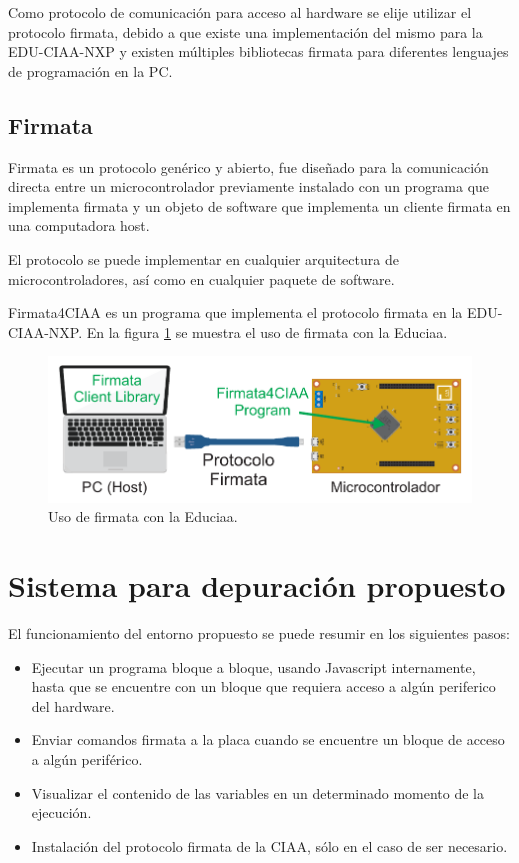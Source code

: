 Como protocolo de comunicación para acceso al hardware se elije utilizar el protocolo firmata, debido a que existe una implementación del mismo para la EDU-CIAA-NXP \citep{CIAA:firmwarev2} y existen múltiples bibliotecas firmata para diferentes lenguajes de programación en la PC.  

\subsection{Firmata}
\label{subsec:Firmata}

Firmata es un protocolo genérico y abierto, fue diseñado para la comunicación directa entre un microcontrolador previamente instalado con un programa que implementa firmata y un objeto de software que implementa un cliente firmata en una computadora host. 

El protocolo se puede implementar en cualquier arquitectura de microcontroladores, así como en cualquier paquete de software.

Firmata4CIAA es un programa que implementa el protocolo firmata en la EDU-CIAA-NXP. En la figura \ref{fig:componentesFirmata} se muestra el uso de firmata con la Educiaa.

\begin{figure}[h]
	\centering
	\includegraphics[scale=.80]{./Figures/Firmata4CIAA_01.pdf}
	\caption{Uso de firmata con la Educiaa.}
	\label{fig:componentesFirmata}
\end{figure}

\section{Sistema para depuración propuesto}
\label{section:Sistema para depuración propuesto}

El funcionamiento del entorno propuesto se puede resumir en los siguientes pasos:

\begin{itemize}
	\item Ejecutar un programa bloque a bloque, usando Javascript internamente, hasta que se encuentre con un bloque que requiera acceso a algún periferico del hardware.
	\item Enviar comandos firmata a la placa cuando se encuentre un bloque de acceso a algún periférico.
	\item Visualizar el contenido de las variables en un determinado momento de la ejecución.
	\item Instalación del protocolo firmata de la CIAA, sólo en el caso de ser necesario.
\end{itemize}	

